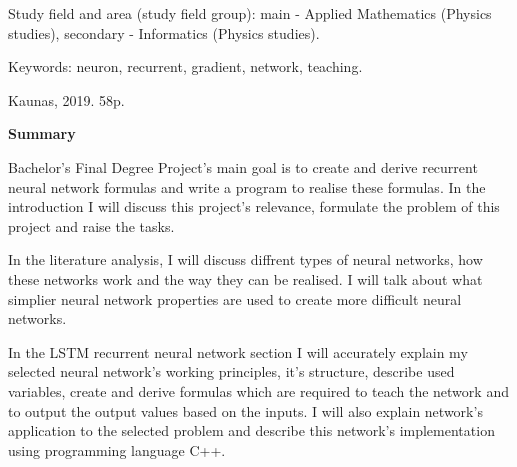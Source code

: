 Study field and area (study field group): main - Applied Mathematics (Physics studies), secondary - Informatics (Physics studies).

Keywords: neuron, recurrent, gradient, network, teaching.

Kaunas, 2019. 58p.

\begin{center}
\textbf{Summary}
\end{center}

Bachelor's Final Degree Project's main goal is to create and derive recurrent neural network formulas and write a program to realise these formulas. In the introduction I will discuss this project's relevance, formulate the problem of this project and raise the tasks.

In the literature analysis, I will discuss diffrent types of neural networks, how these networks work and the way they can be realised. I will talk about what simplier neural network properties are used to create more difficult neural networks.

In the LSTM recurrent neural network section I will accurately explain my selected neural network's working principles, it's structure, describe used variables, create and derive formulas which are required to teach the network and to output the output values based on the inputs. I will also explain network's application to the selected problem and describe this network's implementation using programming language C++.

